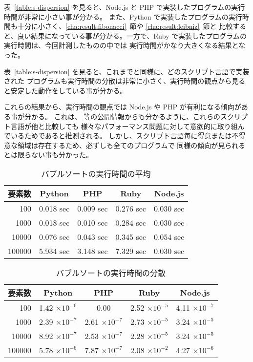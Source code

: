 表~\ref{table:s-dispersion} を見ると、Node.js と PHP で実装したプログラムの実行時間が非常に小さい事が分かる。
また、Python で実装したプログラムの実行時間も十分に小さく、\ref{cha:result:fibonacci}~節や \ref{cha:result:leibniz}~節と
比較すると、良い結果になっている事が分かる。一方で、Ruby で実装したプログラムの実行時間は、今回計測したものの中では
実行時間がかなり大きくなる結果となった。

表~\ref{table:s-dispersion} を見ると、これまでと同様に、どのスクリプト言語で実装された
プログラムも実行時間の分散は非常に小さく、実行時間の観点から見ると安定した動作をしている事が分かる。

これらの結果から、実行時間の観点では Node.js や PHP が有利になる傾向がある事が分かる。
これは、\cite{PHP7} 等の公開情報からも分かるように、これらのスクリプト言語が他と比較しても
様々なパフォーマンス問題に対して意欲的に取り組んでいるためであると推測される。
しかし、スクリプト言語毎に得意または不得意な領域は存在するため、必ずしも全てのプログラムで
同様の傾向が見られるとは限らない事も分かった。

\begin{table}[tbp]
\centering
\caption{バブルソートの実行時間の平均}
\label{table:b-average}
\begin{tabular}{|r||c|c|c|c|}
\hline
要素数 & Python & PHP &Ruby	&Node.js \\ \hline \hline
100	    & 0.018 sec & 0.009 sec	& 0.276	sec & 0.030 sec \\ \hline
1000	& 0.018 sec	& 0.010 sec	& 0.284	sec & 0.030 sec \\ \hline
10000	& 0.076 sec	& 0.043 sec	& 0.345	sec & 0.054 sec \\ \hline
100000	& 5.934 sec	& 3.148	sec & 7.329	sec & 0.030 sec \\ \hline
\end{tabular}
\end{table}

\begin{table}[tbp]
\centering
\caption{バブルソートの実行時間の分散}
\label{table:b-dispersion}
\begin{tabular}{|r||c|c|c|c|}
\hline
要素数 & Python & PHP &Ruby	&Node.js \\ \hline \hline
100     & 1.42 $\times 10^{-6}$ & 0.00                  & 2.52 $\times 10^{-5}$	& 4.11 $\times 10^{-7}$ \\ \hline
1000	& 2.39 $\times 10^{-7}$ & 2.61 $\times 10^{-7}$ & 2.73 $\times 10^{-5}$	& 3.24 $\times 10^{-5}$ \\ \hline
10000	& 8.92 $\times 10^{-7}$ & 2.53 $\times 10^{-7}$ & 2.28 $\times 10^{-5}$ & 3.24 $\times 10^{-5}$ \\ \hline
100000	& 5.78 $\times 10^{-6}$ & 7.87 $\times 10^{-7}$ & 2.08 $\times 10^{-2}$ & 4.27 $\times 10^{-6}$ \\ \hline
\end{tabular}
\end{table}


